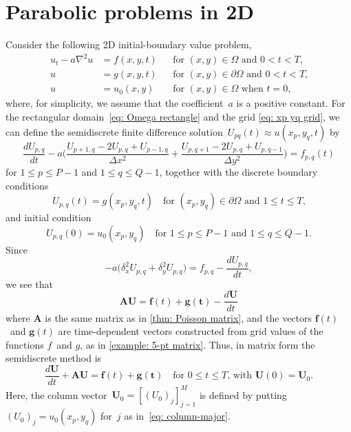 \section{Parabolic problems in 2D}
Consider the following 2D initial-boundary value problem,
\begin{equation}\label{eq: ibvp 2d}
\begin{aligned}
u_t-a\nabla^2u&=f(x,y,t)&&\text{for $(x,y)\in\Omega$ and $0<t<T$,}\\
u&=g(x,y,t)&&\text{for $(x,y)\in\partial\Omega$ and $0<t<T$,}\\
u&=u_0(x,y)&&\text{for $(x,y)\in\Omega$ when $t=0$,}
\end{aligned}
\end{equation}
where, for simplicity, we assume that the coefficient~$a$ is a positive
constant.  For the rectangular domain~\eqref{eq: Omega rectangle} and the
grid \eqref{eq: xp yq grid}, we can define the semidiscrete finite difference
solution~$U_{pq}(t)\approx u(x_p,y_q,t)$ by
\[
\frac{dU_{p,q}}{dt}-a\biggl(\frac{U_{p+1,q}-2U_{p,q}+U_{p-1,q}}{\Delta x^2}
	+\frac{U_{p,q+1}-2U_{p,q}+U_{p,q-1}}{\Delta y^2}\biggr)=f_{p,q}(t)
\]
for $1\le p\le P-1$ and $1\le q\le Q-1$, together with the discrete
boundary conditions
\[
U_{p,q}(t)=g(x_p,y_q,t)\quad
	\text{for $(x_p,y_q)\in\partial\Omega$ and $1\le t\le T$,}
\]
and initial condition
\[
U_{p,q}(0)=u_0(x_p,y_q)\quad\text{for $1\le p\le P-1$ and $1\le q\le Q-1$.}
\]
Since
\[
-a\bigl(\delta_x^2U_{p,q}+\delta_y^2U_{p,q}\bigr)=f_{p,q}-\frac{dU_{p,q}}{dt},
\]
we see that
\[
\boldsymbol{A}\boldsymbol{U}=\boldsymbol{f}(t)+\boldsymbol{g(t)}
	-\frac{d\boldsymbol{U}}{dt}
\]
where $\boldsymbol{A}$ is the same matrix as in \cref{thm: Poisson matrix},
and the vectors $\boldsymbol{f}(t)$~and $\boldsymbol{g}(t)$ are time-dependent
vectors constructed from grid values of the functions $f$~and $g$, as in 
\cref{example: 5-pt matrix}.  Thus, in matrix form the semidiscrete method is
\[
\frac{d\boldsymbol{U}}{dt}+\boldsymbol{A}\boldsymbol{U}
	=\boldsymbol{f}(t)+\boldsymbol{g(t)} 
\quad\text{for $0\le t\le T$, with $\boldsymbol{U}(0)=\boldsymbol{U}_0$.}
\]
Here, the column vector~$\boldsymbol{U}_0=[(U_0)_j]_{j=1}^M$ is defined
by putting $(U_0)_j=u_0(x_p,y_q)$ for~$j$ as in~\eqref{eq: column-major}.

